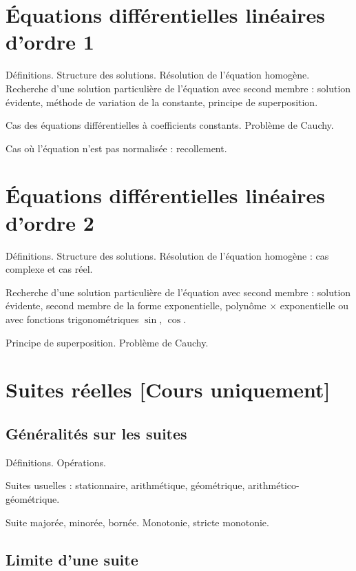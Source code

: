 \documentclass[a4paper,french,bookmarks]{article}
\begin{document}

\section*{Équations différentielles linéaires d’ordre 1}

Définitions. Structure des solutions. Résolution de l’équation homogène. Recherche d’une solution particulière de l’équation avec second membre : solution évidente, méthode de variation de la constante, principe
de superposition.

Cas des équations différentielles à coefficients constants. Problème de Cauchy.

Cas où l’équation n’est pas normalisée : recollement.

\section*{Équations différentielles linéaires d’ordre 2}

Définitions. Structure des solutions. Résolution de l’équation homogène : cas complexe et cas réel.

Recherche d’une solution particulière de l’équation avec second membre : solution évidente, second membre de la forme exponentielle, polynôme $\times$ exponentielle ou avec fonctions trigonométriques $\sin$, $\cos$.

Principe de superposition. Problème de Cauchy.

\section*{Suites réelles [Cours uniquement]}

\subsection*{Généralités sur les suites}

Définitions. Opérations.

Suites usuelles : stationnaire, arithmétique, géométrique, arithmético-géométrique.

Suite majorée, minorée, bornée. Monotonie, stricte monotonie.

\subsection*{Limite d’une suite}
\end{document}
